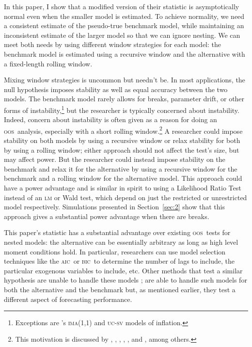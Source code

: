 \documentclass[11pt,fleqn]{article}
\newcommand\citepos[2][]{\citeauthor{#2}'s \citeyearpar[#1]{#2}}
\theoremstyle{definition}
\newcommand{\aic}{\textsc{aic}}
\newcommand{\bic}{\textsc{bic}}
\newcommand{\oos}{\textsc{oos}}
\begin{document}
In this paper, I show that a modified version of their statistic is
asymptotically normal even when the smaller model is estimated.  To
achieve normality, we need a consistent estimate of the pseudo-true
benchmark model, while maintaining an inconsistent estimate of the
larger model so that we can ignore nesting.  We can meet both needs by
using different window strategies for each model: the benchmark model
is estimated using a recursive window and the alternative with a
fixed-length rolling window.

Mixing window strategies is uncommon but needn't be. In most
applications, the null hypothesis imposes stability as well as equal
accuracy between the two models.  The benchmark model rarely allows
for breaks, parameter drift, or other forms of
instability,\footnote{Exceptions are \citepos{StW:07}
  \textsc{ima}(1,1) and \textsc{uc-sv} models of inflation.} but the
researcher is typically concerned about instability.  Indeed, concern
about instability is often given as a reason for doing an \oos\
analysis, especially with a short rolling window.\footnote{This
  motivation is discussed by \citet{StW:03}, \citet{PeT:05,PeT:07},
  \cite{GiW:06}, \citet{GoW:08}, \citet{ClM:09c}, and
  \cite{GiR:09,GiR:10}, among others.} A researcher could impose
stability on both models by using a recursive window or relax
stability for both by using a rolling window; either approach should
not affect the test's size, but may affect power.  But the researcher
could instead impose stability on the benchmark and relax it for the
alternative by using a recursive window for the benchmark and a
rolling window for the alternative model.  This approach could have a
power advantage and is similar in spirit to using a Likelihood Ratio
Test instead of an \textsc{lm} or Wald test, which depend on just the
restricted or unrestricted model respectively.  Simulations presented
in Section~\ref{sec:2} show that this approach gives a substantial
power advantage when there are breaks.

This paper's statistic has a substantial advantage over existing \oos\
tests for nested models: the alternative can be essentially arbitrary
as long as high level moment conditions hold.  In particular,
researchers can use model selection techniques like the \aic\ or \bic\
to determine the number of lags to include, the particular exogenous
variables to include, etc.  Other methods that test a similar
hypothesis are unable to handle these models \citep[except][which does
not allow the benchmark to be estimated]{ClW:06}; \citet{GiW:06} are
able to handle such models for both the alternative and the benchmark
but, as mentioned earlier, they test a different aspect of forecasting
performance.
\end{document}

